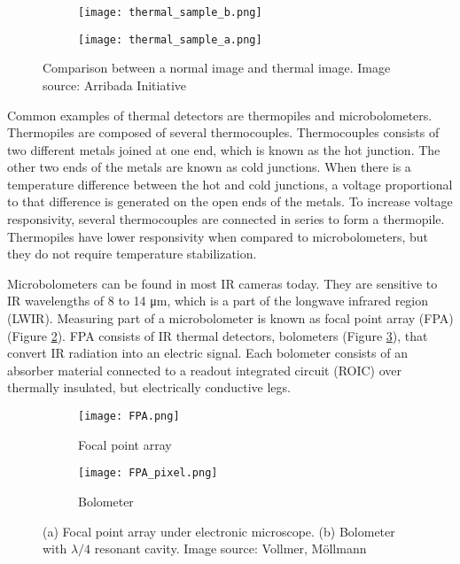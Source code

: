 \begin{figure}[ht]
    \begin{subfigure}{0.5\textwidth}
        \centering
        \texttt{[image: thermal\_sample\_b.png]} 
    \end{subfigure}
    \begin{subfigure}{0.5\textwidth}
        \centering
        \texttt{[image: thermal\_sample\_a.png]}
    \end{subfigure}
    \caption[Comparison between a normal image and thermal image]{Comparison between a normal image and thermal image. Image source: Arribada Initiative\cite{thermal_comparison}}
    \label{thermal_comparison}
\end{figure}

Common examples of thermal detectors are thermopiles and microbolometers. 
Thermopiles are composed of several thermocouples.
Thermocouples consists of two different metals joined at one end, which is known as the hot junction.
The other two ends of the metals are known as cold junctions.
When there is a temperature difference between the hot and cold junctions, a voltage proportional to that difference is generated on the open ends of the metals.
To increase voltage responsivity, several thermocouples are connected in series to form a thermopile\cite{thermal_book}.
Thermopiles have lower responsivity when compared to microbolometers, but they do not require temperature stabilization\cite{thermal_book}.

Microbolometers can be found in most IR cameras today\cite{thermal_book}. 
They are sensitive to IR wavelengths of 8 to 14 \si{\micro\meter}, which is a part of the longwave infrared region (LWIR)\cite{thermal_book}.
Measuring part of a microbolometer is known as focal point array (FPA) (Figure \ref{FPA}).
FPA consists of IR thermal detectors, bolometers (Figure \ref{FPA_pixel}), that convert IR radiation into an electric signal.
Each bolometer consists of an absorber material connected to a readout integrated circuit (ROIC) over thermally insulated, but electrically conductive legs\cite{thermal_article}.
\newline

\begin{figure}[h]
    \begin{subfigure}{0.5\textwidth}
        \centering
        \texttt{[image: FPA.png]} 
        \caption{Focal point array}
        \label{FPA}
    \end{subfigure}
    \begin{subfigure}{0.5\textwidth}
        \centering
        \texttt{[image: FPA\_pixel.png]}
        \caption{Bolometer}
        \label{FPA_pixel}
    \end{subfigure}
    \caption[Focal point array and bolometer.] {(a) Focal point array under electronic microscope. (b) Bolometer with $\lambda /4$ resonant cavity. Image source: Vollmer, Möllmann\cite{thermal_book}}
    \label{FPA_microbolo}
\end{figure}

